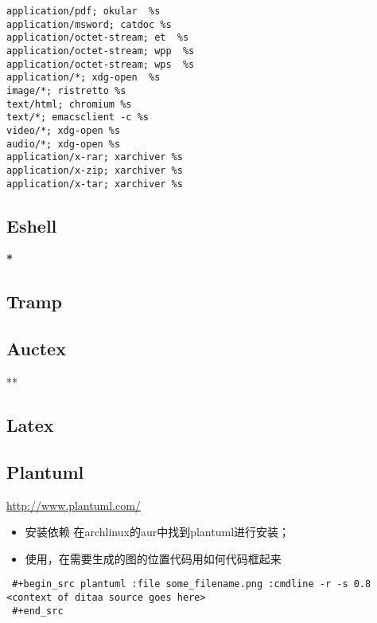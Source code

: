 \documentclass[10pt,a4paper]{article}
\begin{document}
\begin{itemize}
\begin{itemize}
\begin{lstlisting}
application/pdf; okular  %s
application/msword; catdoc %s
application/octet-stream; et  %s
application/octet-stream; wpp  %s
application/octet-stream; wps  %s
application/*; xdg-open  %s
image/*; ristretto %s
text/html; chromium %s
text/*; emacsclient -c %s
video/*; xdg-open %s
audio/*; xdg-open %s
application/x-rar; xarchiver %s
application/x-zip; xarchiver %s
application/x-tar; xarchiver %s
\end{lstlisting}
\end{itemize}
\end{itemize}
\subsection{Eshell}
\label{sec-2-5}

\textbf{*}

\subsection{Tramp}
\label{sec-2-6}
\subsection{Auctex}
\label{sec-2-7}

**
\subsection{Latex}
\label{sec-2-8}
\subsection{Plantuml}
\label{sec-2-9}
\url{http://www.plantuml.com/}
\begin{itemize}
\item 安装依赖
在archlinux的aur中找到plantuml进行安装；
\item 使用，在需要生成的图的位置代码用如何代码框起来
\end{itemize}
\begin{lstlisting}
 #+begin_src plantuml :file some_filename.png :cmdline -r -s 0.8
<context of ditaa source goes here>
 #+end_src
\end{lstlisting}
\end{document}
